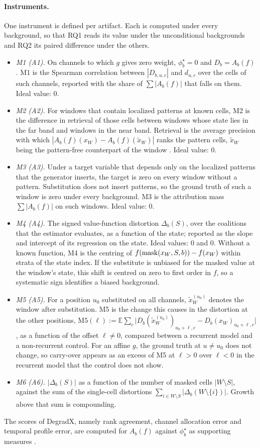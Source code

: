 \documentclass{article}
\begin{document}
\paragraph{Instruments.} One instrument is defined per artifact. Each is computed under every background, so that RQ1 reads its value under the unconditional backgrounds and RQ2 its paired difference under the others.
\begin{itemize}
\item \emph{M1 (A1).} On channels to which $g$ gives zero weight, $\phi^\star_b=0$ and $D_b=A_b(f)$. M1 is the Spearman correlation between $|D_{b,u,c}|$ and $d_{u,c}$ over the cells of such channels, reported with the share of $\sum|A_b(f)|$ that falls on them. Ideal value: 0.
\item \emph{M2 (A2).} For windows that contain localized patterns at known cells, M2 is the difference in retrieval of those cells between windows whose state lies in the far band and windows in the near band. Retrieval is the average precision with which $|A_b(f)(x_W)-A_b(f)(\tilde x_W)|$ ranks the pattern cells, $\tilde x_W$ being the pattern-free counterpart of the window \citep{degradx2026}. Ideal value: 0.
\item \emph{M3 (A3).} Under a target variable that depends only on the localized patterns that the generator inserts, the target is zero on every window without a pattern. Substitution does not insert patterns, so the ground truth of such a window is zero under every background. M3 is the attribution mass $\sum|A_b(f)|$ on such windows. Ideal value: 0.
\item \emph{M4 (A4).} The signed value-function distortion $\Delta_b(S)$, over the coalitions that the estimator evaluates, as a function of the state; reported as the slope and intercept of its regression on the state. Ideal values: 0 and 0. Without a known function, M4 is the centring of $f(\operatorname{mask}(x_W,S,b))-f(x_W)$ within strata of the state index. If the substitute is unbiased for the masked value at the window's state, this shift is centred on zero to first order in $f$, so a systematic sign identifies a biased background.
\item \emph{M5 (A5).} For a position $u_0$ substituted on all channels, $\tilde x^{(u_0)}_W$ denotes the window after substitution. M5 is the change this causes in the distortion at the other positions, $\mathrm{M5}(\ell) := \mathbb{E}\sum_c \bigl|D_b(\tilde x^{(u_0)}_W)_{u_0+\ell,c}-D_b(x_W)_{u_0+\ell,c}\bigr|$, as a function of the offset $\ell\neq 0$, compared between a recurrent model and a non-recurrent control. For an affine $g$, the ground truth at $u\neq u_0$ does not change, so carry-over appears as an excess of M5 at $\ell>0$ over $\ell<0$ in the recurrent model that the control does not show.
\item \emph{M6 (A6).} $|\Delta_b(S)|$ as a function of the number of masked cells $|W\setminus S|$, against the sum of the single-cell distortions $\sum_{i\in W\setminus S}|\Delta_b(W\setminus\{i\})|$. Growth above that sum is compounding.
\end{itemize}
The scores of DegradX, namely rank agreement, channel allocation error and temporal profile error, are computed for $A_b(f)$ against $\phi^\star_b$ as supporting measures \citep{degradx2026}.
\end{document}
